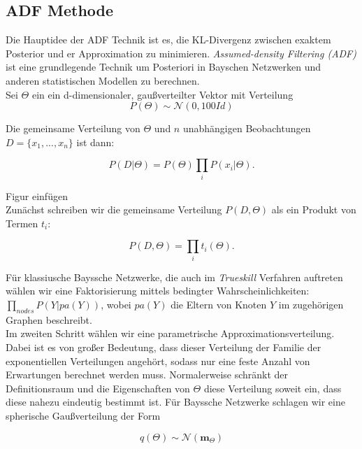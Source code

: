 \documentclass[12pt,a4paper]{scrartcl}
\numberwithin{equation}{section}
\begin{document}
{  \subsection{ADF Methode}
  
  Die Hauptidee der ADF Technik ist es, die KL-Divergenz zwischen exaktem Posterior und er Approximation zu minimieren.
  \textit{Assumed-density Filtering (ADF)} ist eine grundlegende Technik um Posteriori in Bayschen Netzwerken
  und anderen statistischen Modellen zu berechnen. \\
  Sei $\Theta$ ein ein d-dimensionaler, gaußverteilter Vektor mit Verteilung 
  \begin{equation}
   P(\Theta) \sim \mathcal{N}(0,100Id)
  \end{equation}
  
  Die gemeinsame Verteilung von $\Theta$ und $n$ unabhängigen Beobachtungen $D = \{x_1,...,x_n\}$ ist dann: 
  
  \begin{equation}
   P(D|\Theta) = P(\Theta) \prod_i P(x_i|\Theta).
  \end{equation}
  
  Figur einfügen \\
  
  Zunächst schreiben wir die gemeinsame Verteilung $P(D, \Theta)$ als ein Produkt von Termen
  $t_i$: 
  
  \begin{equation}
   P(D, \Theta) = \prod_i t_i(\Theta).
  \end{equation}
  
  Für klassiusche Bayssche Netzwerke, die auch im \textit{Trueskill} Verfahren auftreten wählen wir eine 
  Faktorisierung mittels bedingter Wahrscheinlichkeiten: $\prod_{nodes} P(Y|pa(Y))$, wobei $pa(Y)$
  die Eltern von Knoten $Y$ im zugehörigen Graphen beschreibt. \\
  Im zweiten Schritt wählen wir eine parametrische Approximationsverteilung. Dabei ist es von großer Bedeutung, 
  dass dieser Verteilung der Familie der exponentiellen Verteilungen angehört, sodass nur eine feste Anzahl 
  von Erwartungen berechnet werden muss. 
  Normalerweise schränkt der Definitionsraum und die Eigenschaften von $\Theta$ diese Verteilung soweit ein, dass 
  diese nahezu eindeutig bestimmt ist. 
  Für Bayssche Netzwerke schlagen wir eine spherische Gaußverteilung der Form
  
  \begin{equation}
   q(\Theta) \sim \mathcal{N}(\mathbf{m}_{\Theta})
  \end{equation}

}
\end{document}
